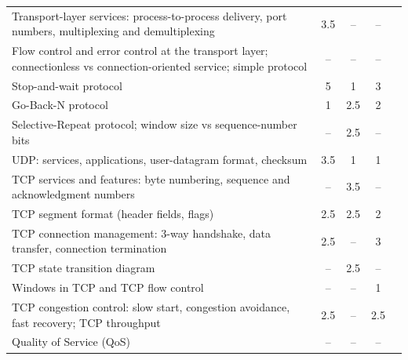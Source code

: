 {\begin{xltabular}{\linewidth}{Ycccc}
Transport-layer services: process-to-process delivery, port numbers, multiplexing and demultiplexing & 3.5 & \textcolor{muted}{--} & \textcolor{muted}{--} & \\
Flow control and error control at the transport layer; connectionless vs connection-oriented service; simple protocol & \textcolor{muted}{--} & \textcolor{muted}{--} & \textcolor{muted}{--} & \\
Stop-and-wait protocol & 5 & 1 & 3 & \\
Go-Back-N protocol & 1 & 2.5 & 2 & \\
Selective-Repeat protocol; window size vs sequence-number bits & \textcolor{muted}{--} & 2.5 & \textcolor{muted}{--} & \\
UDP: services, applications, user-datagram format, checksum & 3.5 & 1 & 1 & \\
TCP services and features: byte numbering, sequence and acknowledgment numbers & \textcolor{muted}{--} & 3.5 & \textcolor{muted}{--} & \\
TCP segment format (header fields, flags) & 2.5 & 2.5 & 2 & \\
TCP connection management: 3-way handshake, data transfer, connection termination & 2.5 & \textcolor{muted}{--} & 3 & \\
TCP state transition diagram & \textcolor{muted}{--} & 2.5 & \textcolor{muted}{--} & \\
Windows in TCP and TCP flow control & \textcolor{muted}{--} & \textcolor{muted}{--} & 1 & \\
TCP congestion control: slow start, congestion avoidance, fast recovery; TCP throughput & 2.5 & \textcolor{muted}{--} & 2.5 & \\
Quality of Service (QoS) & \textcolor{muted}{--} & \textcolor{muted}{--} & \textcolor{muted}{--} & \\
\bottomrule\end{xltabular}}

